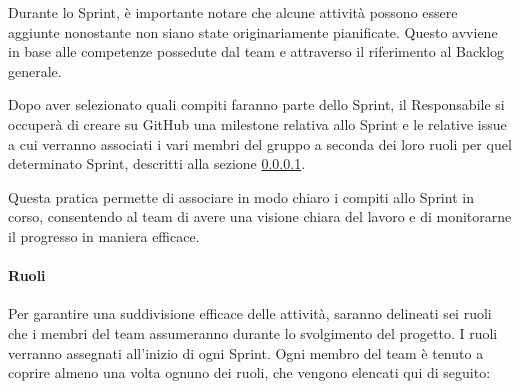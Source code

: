         \noindent
        Durante lo Sprint, è importante notare che alcune attività possono essere aggiunte nonostante non siano state originariamente pianificate. Questo avviene in base alle competenze possedute dal team e attraverso il riferimento al Backlog generale.

        \noindent
        Dopo aver selezionato quali compiti faranno parte dello Sprint, il Responsabile si occuperà di creare su GitHub una milestone relativa allo Sprint e le relative issue a cui verranno associati i vari membri del gruppo a seconda dei loro ruoli per quel determinato Sprint, descritti alla sezione \ref{sec:ruoli}. 

        \vspace{0.3cm}
        \noindent
        Questa pratica permette di associare in modo chiaro i compiti allo Sprint in corso, consentendo al team di avere una visione chiara del lavoro e di monitorarne il progresso in maniera efficace.

        \paragraph{Ruoli} \label{sec:ruoli}
        Per garantire una suddivisione efficace delle attività, saranno delineati sei ruoli che i membri del team assumeranno durante lo svolgimento del progetto. 
        I ruoli verranno assegnati all'inizio di ogni Sprint.
        Ogni membro del team è tenuto a coprire almeno una volta ognuno dei ruoli, che vengono elencati qui di seguito:
        
